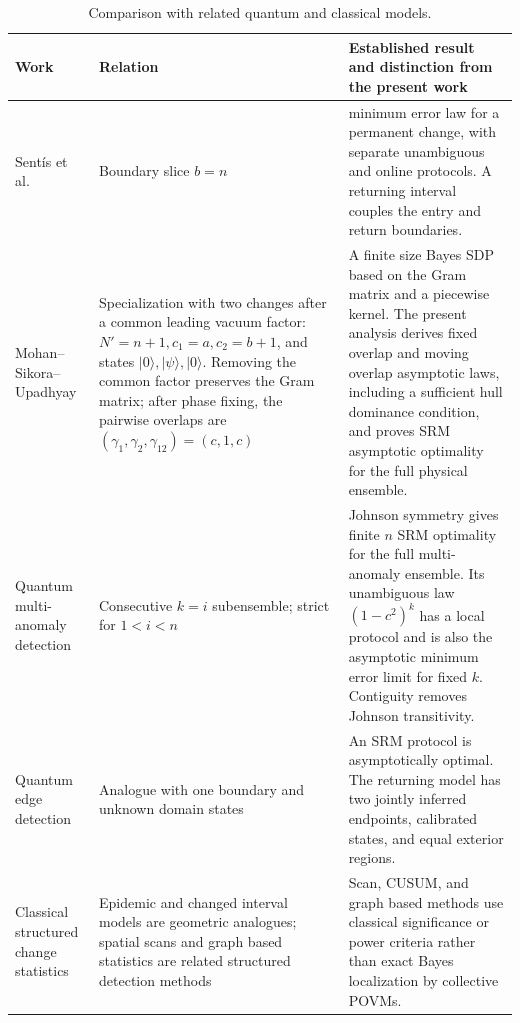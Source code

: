 \begin{table}[t]
\centering
\caption{Comparison with related quantum and classical models.}
\label{tab:literature}
\footnotesize
\begin{tabularx}{\textwidth}{@{}
>{\raggedright\arraybackslash}p{}
>{\raggedright\arraybackslash}p{}
>{\raggedright\arraybackslash}X@{}}
\toprule
Work & Relation & Established result and distinction from the present work \\
\midrule
Sentís et al.~\cite{sentis2016,sentis2017,sentis2018}
& Boundary slice \(b=n\)
& minimum error law for a permanent change, with separate unambiguous and
online protocols. A returning interval couples the entry and return
boundaries. \\
Mohan--Sikora--Upadhyay \cite{mohan2023}
& Specialization with two changes after a common leading vacuum factor:
\(N'=n+1,c_1=a,c_2=b+1\), and states
\(\lvert0\rangle,\lvert\psi\rangle,\lvert0\rangle\). Removing the common
factor preserves the Gram matrix; after phase fixing, the pairwise overlaps
are \((\gamma_1,\gamma_2,\gamma_{12})=(c,1,c)\)
& A finite size Bayes SDP based on the Gram matrix and a piecewise kernel. The
present analysis derives fixed overlap and moving overlap asymptotic laws,
including a sufficient hull dominance condition, and proves SRM asymptotic
optimality for the full physical ensemble. \\
Quantum multi-anomaly detection \cite{llorens2024}
& Consecutive \(k=i\) subensemble; strict for \(1<i<n\)
& Johnson symmetry gives finite \(n\) SRM optimality for the full
multi-anomaly ensemble. Its unambiguous law \((1-c^2)^k\) has a local protocol
and is also the asymptotic minimum error limit for fixed \(k\). Contiguity
removes Johnson transitivity. \\
Quantum edge detection \cite{llorens2025}
& Analogue with one boundary and unknown domain states
& An SRM protocol is asymptotically optimal. The returning model has two
jointly inferred endpoints, calibrated states, and equal exterior regions. \\
Classical structured change statistics
\cite{levin1985,yao1993,walther2010,chen2015}
& Epidemic and changed interval models are geometric analogues; spatial scans
and graph based statistics are related structured detection methods
& Scan, CUSUM, and graph based methods use classical significance or power
criteria rather than exact Bayes localization by collective POVMs. \\
\bottomrule
\end{tabularx}
\end{table}






